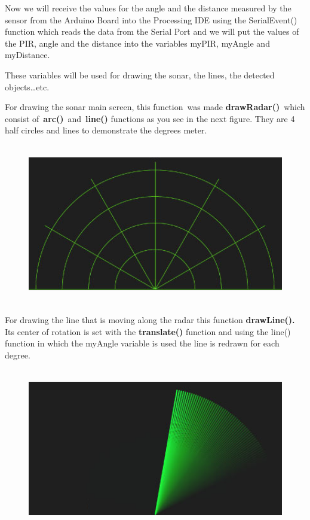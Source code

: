 Now we will receive the values for the angle and the distance measured by the sensor from the Arduino Board into the Processing IDE using the SerialEvent() function which reads the data from the Serial Port and we will put the values of the PIR, angle and the distance into the variables myPIR, myAngle and myDistance.

These variables will be used for drawing the sonar, the lines, the detected objects{\dots}etc.

For drawing the sonar main screen, this function~was made \textbf{drawRadar()}~which consist of~\textbf{arc()}~and~\textbf{line()} functions as you see in the next figure.
They are 4 half circles and lines to demonstrate the degrees meter.
\begin{figure}[H]
	\centering
	\includegraphics[width=14cm,height=7cm]{figures/sonar3}
\end{figure}
For drawing the line that is moving along the radar this function \textbf{drawLine(). }Its center of rotation is set with the \textbf{translate() }function and using the line() function in which the myAngle variable is used the line is redrawn for each degree.
\begin{figure}[H]
	\centering
	\includegraphics[width=14cm,height=7cm]{figures/sonar4}
\end{figure}
